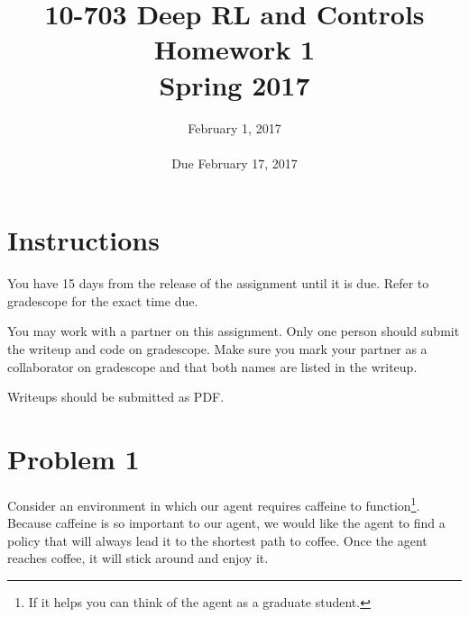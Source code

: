 \documentclass[12pt]{article}
\title{10-703 Deep RL and Controls\\
  Homework 1\\
  Spring 2017\\
}
\date{February 1, 2017\\
  \hspace{1cm}\\
Due February 17, 2017\\
\yl{Yuezhang Li (yuezhanl)}}
\begin{document}
\maketitle

\section*{Instructions}

You have 15 days from the release of the assignment until it is
due. Refer to gradescope for the exact time due.

You may work with a partner on this assignment. Only one person should
submit the writeup and code on gradescope. Make sure you mark your
partner as a collaborator on gradescope and that both names are listed
in the writeup.

Writeups should be submitted as PDF.



\section*{Problem 1}
\label{sec:p1}



Consider an environment in which our agent requires caffeine to
function\footnote{If it helps you can think of the agent as a graduate
  student.}. Because caffeine is so important to our agent, we would
like the agent to find a policy that will always lead it to
the shortest path to coffee. Once the agent reaches coffee, it
will stick around and enjoy it.
\end{document}
